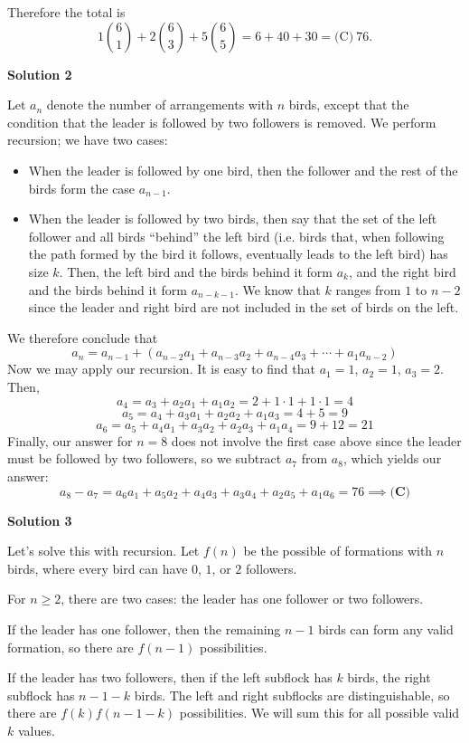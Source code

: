 \begin{enumerate}
 Therefore the total is
 \[1\binom61+2\binom63+5\binom65 =6+40+30 =\boxed{\text{(C)}\ 76}.\]




\textbf{Solution 2}

Let $a_n$ denote the number of arrangements with $n$ birds, except that the condition that the leader is followed by two followers is removed. We perform recursion; we have two cases:

 
            \begin{itemize}
        \item When the leader is followed by one bird, then the follower and the rest of the birds form the case $a_{n-1}$.
        \item When the leader is followed by two birds, then say that the set of the left follower and all birds “behind” the left bird (i.e. birds that, when following the path formed by the bird it follows, eventually leads to the left bird) has size $k$. Then, the left bird and the birds behind it form $a_k$, and the right bird and the birds behind it form $a_{n-k-1}$. We know that $k$ ranges from $1$ to $n-2$ since the leader and right bird are not included in the set of birds on the left.
            \end{itemize}
            We therefore conclude that
 \[a_n=a_{n-1}+(a_{n-2}a_1+a_{n-3}a_2+a_{n-4}a_3+\cdots +a_1a_{n-2})\]Now we may apply our recursion. It is easy to find that $a_1=1$, $a_2=1$, $a_3=2$. Then,
 \[a_4=a_3+a_2a_1+a_1a_2=2+1\cdot 1+1\cdot 1=4\]
 \[a_5=a_4+a_3a_1+a_2a_2+a_1a_3=4+5=9\]
 \[a_6=a_5+a_4a_1+a_3a_2+a_2a_3+a_1a_4=9+12=21\]Finally, our answer for $n=8$ does not involve the first case above since the leader must be followed by two followers, so we subtract $a_7$ from $a_8$, which yields our answer:
 \[a_8-a_7=a_6a_1+a_5a_2+a_4a_3+a_3a_4+a_2a_5+a_1a_6=76\implies \boxed{\textbf{(C)}}\]




\textbf{Solution 3}

Let's solve this with recursion. Let $f(n)$ be the possible of formations with $n$ birds, where every bird can have $0$, $1$, or $2$ followers. 

 For $n\ge 2$, there are two cases: the leader has one follower or two followers.

 If the leader has one follower, then the remaining $n-1$ birds can form any valid formation, so there are $f(n-1)$ possibilities.

 If the leader has two followers, then if the left subflock has $k$ birds, the right subflock has $n-1-k$ birds. The left and right subflocks are distinguishable, so there are $f(k)f(n-1-k)$ possibilities. We will sum this for all possible valid $k$ values. 


\end{enumerate}
